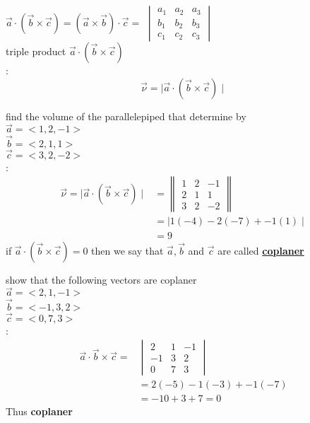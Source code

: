 $\overrightarrow{a} \cdot (\overrightarrow{b} \times \overrightarrow{c}) = (\overrightarrow{a} \times \overrightarrow{b}) \cdot \overrightarrow{c} =$ $\begin{vmatrix}
a_{1} & a_{2} & a_{3} \\
  b_{1} & b_{2} & b_{3} \\
  c_{1} & c_{2} & c_{3} 
 \end{vmatrix}$\\
 triple product $\overrightarrow{a} \cdot (\overrightarrow{b} \times \overrightarrow{c})$\\
{\color{smalt(darkpowderblue)}{ volume of the parallelepiped }}:
$$\overrightarrow{\nu}= \mid \overrightarrow{a} \cdot (\overrightarrow{b} \times \overrightarrow{c}) \mid$$
\noindent{\color{smalt(darkpowderblue)}\rule{\linewidth}{.2mm}}
 \begin{example}
  find the volume of the parallelepiped that determine by \\
 $\overrightarrow{a} = <1,2,-1>$\\
 $\overrightarrow{b} = <2,1,1>$\\
 $\overrightarrow{c} = <3,2,-2>$\\
 {} :
 \begin{align*}
      \overrightarrow{\nu}=\mid \overrightarrow{a} \cdot (\overrightarrow{b} \times \overrightarrow{c}) \mid 
      & = 
\begin{Vmatrix}
 1 & 2 & -1 \\
 2 & 1 & 1 \\
 3 & 2 & -2 
 \end{Vmatrix} \\
 & =\mid 1(-4) -2(-7) + -1(1) \mid \\
 &= 9 
 \end{align*}
if $\overrightarrow{a}\cdot(\overrightarrow{b}\times \overrightarrow{c}) = 0$ then we say that $\overrightarrow{a} , \overrightarrow{b}$ and $\overrightarrow{c}$ are called \textbf{\underline{coplaner}}
\end{example}
\noindent{\color{smalt(darkpowderblue)}\rule{\linewidth}{.2mm}}
\begin{example}
 show that the following vectors are coplaner \\
$\overrightarrow{a} = < 2,1,-1 >$\\
$\overrightarrow{b} = < -1,3,2 >$\\
$\overrightarrow{c} = < 0,7,3 >$\\
 {} : 
 \begin{align*}
  \overrightarrow{a} \cdot \overrightarrow{b} \times \overrightarrow{c} = &
 \begin{vmatrix}
 2 & 1 & -1 \\
 -1 & 3 & 2 \\
 0 & 7 & 3 
 \end{vmatrix} \\
 & =2(-5) -1(-3) + -1(-7) \\
 & = -10 +3 +7 = 0 
 \end{align*}
Thus \textbf{coplaner}
\end{example}
